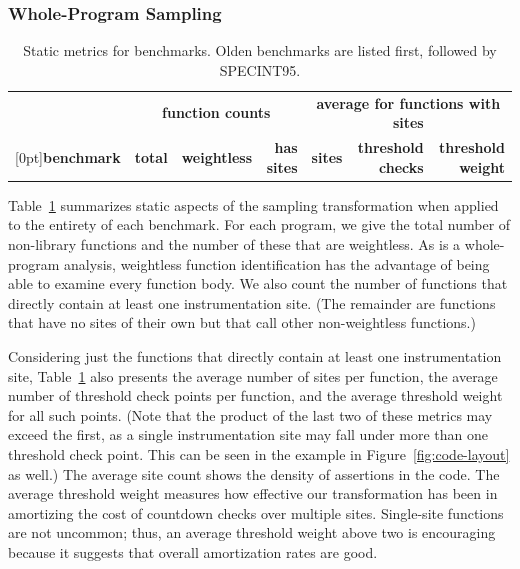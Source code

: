 \subsubsection{Whole-Program Sampling}
\label{sec:share:whole}

\begin{table}
  \centering
  \small
  \begin{tabular}{|l|rrr|rrr|}
    \hline
    & \multicolumn{3}{c|}{\textbf{function counts}} & \multicolumn{3}{c|}{\textbf{average for functions with sites}} \\
    \raisebox{1.5ex}[0pt]{\textbf{benchmark}} & \textbf{total} & \textbf{weightless} & \textbf{has sites} & \textbf{sites} & \textbf{threshold checks} & \textbf{threshold weight} \\
    \hline\hline
    
  \end{tabular}
  \caption{Static metrics for \CCured benchmarks.  Olden benchmarks
    are listed first, followed by SPECINT95.}
  \label{tab:share:static}
\end{table}

Table~\ref{tab:share:static} summarizes static aspects of the sampling
transformation when applied to the entirety of each benchmark.  For
each program, we give the total number of non-library functions and
the number of these that are weightless.  As \CCured is a
whole-program analysis, weightless function identification has the
advantage of being able to examine every function body.  We also count
the number of functions that directly contain at least one
instrumentation site.  (The remainder are functions that have no sites
of their own but that call other non-weightless functions.)

Considering just the functions that directly contain at least one
instrumentation site, Table~\ref{tab:share:static} also presents the
average number of sites per function, the average number of threshold
check points per function, and the average threshold weight for all
such points.  (Note that the product of the last two of these metrics
may exceed the first, as a single instrumentation site may fall under
more than one threshold check point.  This can be seen in the example
in Figure~\ref{fig:code-layout} as well.)  The average site count
shows the density of assertions in the code.  The average
threshold weight measures how effective our transformation has been in
amortizing the cost of countdown checks over multiple sites.
Single-site functions are not uncommon; thus, an average threshold
weight above two is encouraging because it suggests that overall
amortization rates are good.

